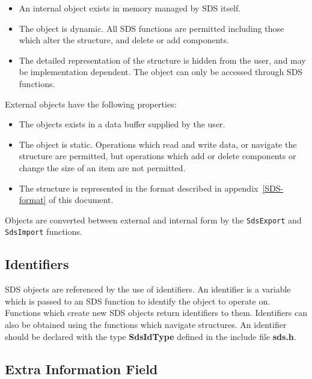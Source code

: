 \begin{itemize}

\item An internal object exists in memory managed by SDS itself.

\item The object is dynamic. All SDS functions are permitted including
those which alter the structure, and delete or add components.

\item The detailed representation of the structure is hidden from the user, and
may be implementation dependent. The object can only be accessed through SDS
functions.

\end{itemize}

External objects have the following properties:

\begin{itemize}

\item The objects exists in a data buffer supplied by the user.

\item The object is static. Operations which read and write data, or
navigate the structure are permitted, but operations which add or delete
components or change the size of an item are not permitted.

\item The structure is represented in the format described in
appendix~\ref{SDS-format} of
this document.

\end{itemize}

Objects are converted between external and internal form by the 
\verb$SdsExport$ and \verb$SdsImport$ functions.

\subsection{Identifiers}

SDS objects are referenced by the use of identifiers. An identifier is a
variable which is passed to an SDS function to identify the object to operate
on. Functions which create new SDS objects return identifiers to them.
Identifiers can also be obtained using the functions which navigate structures.
An identifier should be declared with the type {\bf SdsIdType} defined in the include file
{\bf sds.h}.

\subsection{Extra Information Field}

